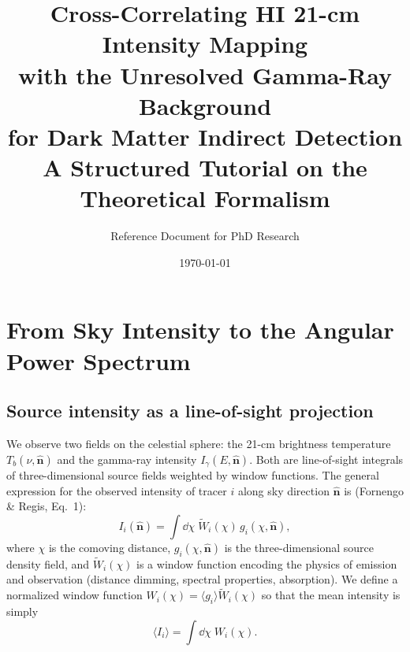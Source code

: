 \documentclass[10pt,a4paper]{article}
\title{\textbf{Cross-Correlating HI 21-cm Intensity Mapping \\ with the Unresolved Gamma-Ray Background \\ for Dark Matter Indirect Detection} \\[12pt]
\large A Structured Tutorial on the Theoretical Formalism}
\author{Reference Document for PhD Research}
\date{\today}
\newcommand{\nhat}{\hat{\mathbf{n}}}
\newcommand{\vect}[1]{\mathbf{#1}}
\begin{document}




\section{From Sky Intensity to the Angular Power Spectrum}
\label{sec:part1}

\subsection{Source intensity as a line-of-sight projection}

We observe two fields on the celestial sphere: the 21-cm brightness temperature $T_b(\nu, \hat{\vect{n}})$ and the gamma-ray intensity $I_\gamma(E, \nhat)$. Both are line-of-sight integrals of three-dimensional source fields weighted by window functions. The general expression for the observed intensity of tracer $i$ along sky direction $\nhat$ is (Fornengo \& Regis, Eq.~1):
\begin{equation}
\label{eq:intensity_los}
I_i(\nhat) = \int \dd\chi \; \tilde{W}_i(\chi) \, g_i(\chi, \nhat),
\end{equation}
where $\chi$ is the comoving distance, $g_i(\chi, \nhat)$ is the three-dimensional source density field, and $\tilde{W}_i(\chi)$ is a window function encoding the physics of emission and observation (distance dimming, spectral properties, absorption). We define a normalized window function $W_i(\chi) = \langle g_i \rangle \tilde{W}_i(\chi)$ so that the mean intensity is simply
\begin{equation}
\langle I_i \rangle = \int \dd\chi \; W_i(\chi).
\end{equation}
\end{document}

